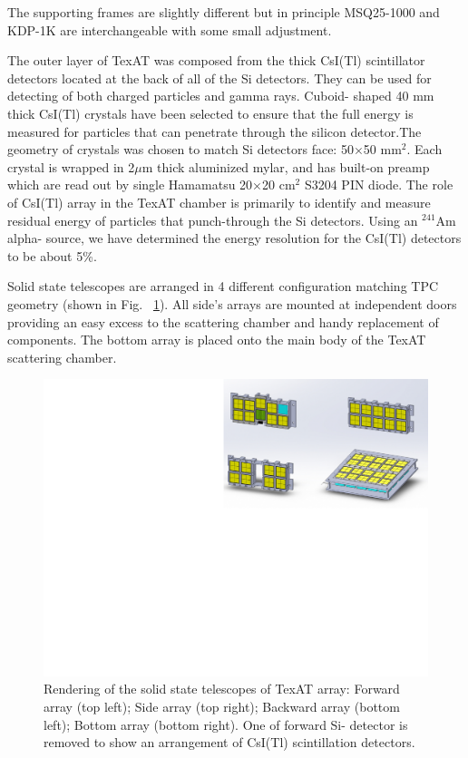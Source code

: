 \documentclass[final,number,sort&compress,5p,times,twocolumn]{elsarticle}
\begin{document}
The supporting frames are slightly different but in principle MSQ25-1000 and KDP-1K  are interchangeable  with some small adjustment. 

The outer layer of TexAT was composed from the thick CsI(Tl) scintillator detectors located at the back of all of the Si detectors. They can be used for detecting of both charged particles and gamma rays. Cuboid- shaped 40 mm thick CsI(Tl) crystals have been selected to ensure that the full energy is measured for particles that can penetrate through the silicon detector.The geometry of crystals was chosen to match Si detectors face: 50$\times$50 mm$^2$. Each crystal is wrapped in 2$\mu$m thick aluminized mylar, and has built-on preamp which are read out by single Hamamatsu 20$\times$20 cm$^2$ S3204 PIN diode. The role of CsI(Tl) array in the TexAT chamber is primarily to identify and measure residual energy of particles that punch-through the Si detectors. Using an $^{241}$Am alpha- source, we have determined the energy resolution for the CsI(Tl) detectors to be about 5\%.

Solid state telescopes are arranged in 4 different configuration matching TPC geometry (shown in Fig. ~\ref{fig:WallsAll}). All side's arrays  are mounted at independent doors providing an easy excess to the scattering chamber and handy replacement of components. The bottom array is placed onto the main body of the TexAT scattering chamber.


\begin{figure}[hbt!]
    \centering
    \includegraphics[width=1.0\columnwidth]{Figs/WallsAll}
    \caption{Rendering of the solid state telescopes of TexAT array: Forward array (top left); Side array (top right); Backward array (bottom left); Bottom array (bottom right). 
    One of forward Si- detector is removed to show an arrangement of CsI(Tl) scintillation detectors.} 
    \label{fig:WallsAll}
\end{figure}
\end{document}
